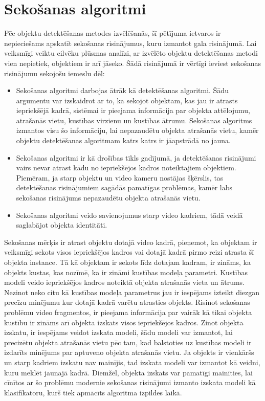 \section{Sekošanas algoritmi}
Pēc objektu detektēšanas metodes izvēlēšanās, šī pētījuma ietvaros ir nepieciešams apskatīt sekošanas risinājumus, kuru izmantot gala risinājumā. Lai veiksmīgi veiktu cilvēku plūsmas analīzi, ar izvēlēto objektu detektēšanas metodi vien nepietiek, objektiem ir arī jāseko. Šādā risinājumā ir vērtīgi ieviest sekošanas risinājumu sekojošu iemeslu dēļ:
\begin{itemize}
	\item Sekošanas algoritmi darbojas ātrāk kā detektēšanas algoritmi. Šādu argumentu var izskaidrot ar to, ka sekojot objektam, kas jau ir atrasts iepriekšējā kadrā, sistēmai ir pieejama informācija par objekta attēlojumu, atrašanās vietu, kustības virzienu un kustības ātrumu. Sekošanas algoritms izmantos visu šo informāciju, lai nepazaudētu objekta atrašanās vietu, kamēr objektu detektēšanas algoritmam katrs katrs ir jāapstrādā no jauna.
	\item Sekošanas algoritmi ir kā drošības tīkls gadījumā, ja detektēšanas risinājumi vairs nevar atrast kādu no iepriekšējos kadros noteiktajiem objektiem. Piemēram, ja starp objektu un video kameru nostājas šķērslis, tas detektēšanas risinājumiem sagādās pamatīgas problēmas, kamēr labs sekošanas risinājums nepazaudētu objekta atrašanās vietu.
	\item Sekošanas algoritmi veido savienojumus starp video kadriem, tādā veidā saglabājot objekta identitāti.
\end{itemize}

Sekošanas mērķis ir atrast objektu dotajā video kadrā, pieņemot, ka objektam ir veiksmīgi sekots visos iepriekšējos kadros vai dotajā kadrā pirmo reizi atrasta šī objekta instance. Tā kā objektam ir sekots līdz dotajam kadram, ir zināms, ka objekts kustas, kas nozīmē, ka ir zināmi kustības modeļa parametri. Kustības modeli veido iepriekšējos kadros noteiktā objekta atrašanās vieta un ātrums. Nezinot neko citu kā kustības modeļa parametrus jau ir iespējams izteikt diezgan precīzu minējumu kur dotajā kadrā varētu atrasties objekts. Risinot sekošanas problēmu video fragmentos, ir pieejama informācija par vairāk kā tikai objekta kustību ir zināms arī objekta izskats visos iepriekšējos kadros. Zinot objekta izskatu, ir iespējams veidot izskata modeli, šādu modeli var izmantot, lai precizētu objekta atrašanās vietu pēc tam, kad balstoties uz kustības modeli ir izdarīts minējums par aptuveno objekta atrašanās vietu. Ja objekts ir vienkāršs un starp kadriem izskatu nav mainījis, tad izskata modeli var izmantot kā veidni, kuru meklēt jaunajā kadrā. Diemžēl, objekta izskats var pamatīgi mainīties, lai cīnītos ar šo problēmu modernie sekošanas risinājumi izmanto izskata modeli kā klasifikatoru, kurš tiek apmācīts algoritma izpildes laikā. 

